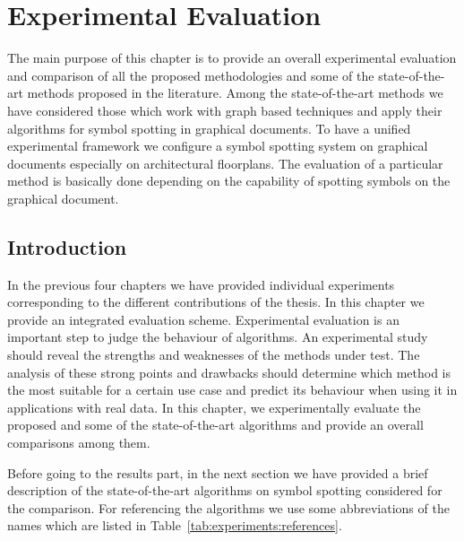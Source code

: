\chapter{Experimental Evaluation}
\label{chap:experiments}
\graphicspath{{./chapters/8-experiments/figs/}}
The main purpose of this chapter is to provide an overall experimental evaluation and comparison of all the proposed methodologies and some of the state-of-the-art methods proposed in the literature. Among the state-of-the-art methods we have considered those which work with graph based techniques and apply their algorithms for symbol spotting in graphical documents. To have a unified experimental framework we configure a symbol spotting system on graphical documents especially on architectural floorplans. The evaluation of a particular method is basically done depending on the capability of spotting symbols on the graphical document.
\section{Introduction}
\label{sec:experiments:intro}
In the previous four chapters we have provided individual experiments corresponding to the different contributions of the thesis. In this chapter we provide an integrated evaluation scheme. Experimental evaluation is an important step to judge the behaviour of algorithms. An experimental study should reveal the strengths and weaknesses of the methods under test. The analysis of these strong points and drawbacks should determine which method is the most suitable for a certain use case and predict its behaviour when using it in applications with real data. In this chapter, we experimentally evaluate the proposed and some of the state-of-the-art algorithms and provide an overall comparisons among them.

Before going to the results part, in the next section we have provided a brief description of the state-of-the-art algorithms on symbol spotting considered for the comparison. For referencing the algorithms we use some abbreviations of the names which are listed in Table~\ref{tab:experiments:references}.

